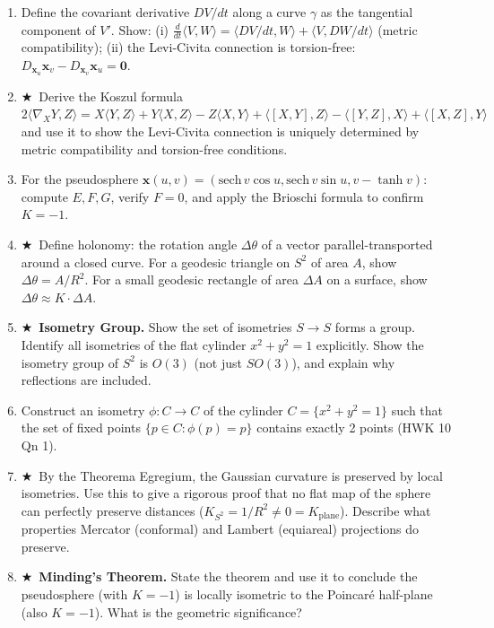 \documentclass[11pt, a4paper]{article}
\newcommand{\hard}{$\bigstar$\ }
\begin{document}
\begin{enumerate}[label=\textbf{Q\arabic*.}, leftmargin=*, itemsep=6pt]
\item Define the covariant derivative $DV/dt$ along a curve $\gamma$ as the tangential component of $V'$. Show: (i) $\frac{d}{dt}\langle V,W\rangle=\langle DV/dt,W\rangle+\langle V,DW/dt\rangle$ (metric compatibility); (ii) the Levi-Civita connection is torsion-free: $D_{\mathbf{x}_u}\mathbf{x}_v-D_{\mathbf{x}_v}\mathbf{x}_u=\mathbf{0}$.

\item \hard Derive the Koszul formula $2\langle\nabla_XY,Z\rangle=X\langle Y,Z\rangle+Y\langle X,Z\rangle-Z\langle X,Y\rangle+\langle[X,Y],Z\rangle-\langle[Y,Z],X\rangle+\langle[X,Z],Y\rangle$ and use it to show the Levi-Civita connection is uniquely determined by metric compatibility and torsion-free conditions.

\item For the pseudosphere $\mathbf{x}(u,v)=(\mathrm{sech}\,v\cos u,\mathrm{sech}\,v\sin u,v-\tanh v)$: compute $E,F,G$, verify $F=0$, and apply the Brioschi formula to confirm $K=-1$.

\item \hard Define holonomy: the rotation angle $\Delta\theta$ of a vector parallel-transported around a closed curve. For a geodesic triangle on $S^2$ of area $A$, show $\Delta\theta=A/R^2$. For a small geodesic rectangle of area $\Delta A$ on a surface, show $\Delta\theta\approx K\cdot\Delta A$.

\item \hard \textbf{Isometry Group.} Show the set of isometries $S\to S$ forms a group. Identify all isometries of the flat cylinder $x^2+y^2=1$ explicitly. Show the isometry group of $S^2$ is $O(3)$ (not just $SO(3)$), and explain why reflections are included.

\item Construct an isometry $\phi:C\to C$ of the cylinder $C=\{x^2+y^2=1\}$ such that the set of fixed points $\{p\in C:\phi(p)=p\}$ contains exactly 2 points (HWK 10 Qn 1).

\item \hard By the Theorema Egregium, the Gaussian curvature is preserved by local isometries. Use this to give a rigorous proof that no flat map of the sphere can perfectly preserve distances ($K_{S^2}=1/R^2\neq 0=K_{\text{plane}}$). Describe what properties Mercator (conformal) and Lambert (equiareal) projections do preserve.

\item \hard \textbf{Minding's Theorem.} State the theorem and use it to conclude the pseudosphere (with $K=-1$) is locally isometric to the Poincar\'e half-plane (also $K=-1$). What is the geometric significance?


\end{enumerate}
\end{document}
